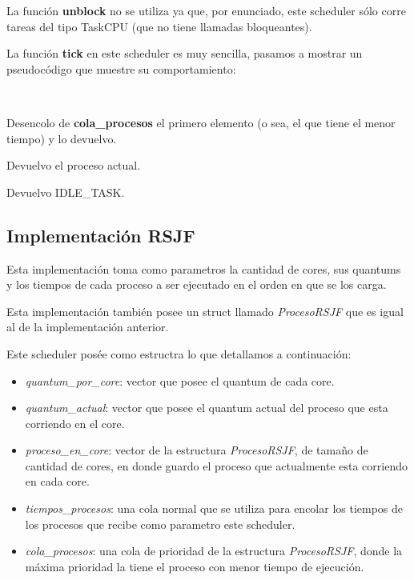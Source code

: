 La función \textbf{unblock} no se utiliza ya que, por enunciado, este scheduler sólo corre tareas del tipo TaskCPU (que no tiene llamadas bloqueantes).

La función \textbf{tick} en este scheduler es muy sencilla, pasamos a mostrar un pseudocódigo que muestre su comportamiento:

~

\begin{algorithmic}

		\State Desencolo de \textbf{cola\_procesos} el primero elemento (o sea, el que tiene el menor tiempo) y lo devuelvo.
	
		\State Devuelvo el proceso actual.

	\Else
		\State Devuelvo IDLE\_TASK.
	\EndIf
\EndFunction	
\end{algorithmic}


\subsection{Implementación \textbf{RSJF}}

Esta implementación toma como parametros la cantidad de cores, sus quantums y los tiempos de cada proceso a ser ejecutado en el orden en que se los carga.

Esta implementación también posee un struct llamado \emph{ProcesoRSJF} que es igual al de la implementación anterior.

Este scheduler posée como estructra lo que detallamos a continuación:

\begin{itemize}

\item \emph{quantum\_por\_core}: vector que posee el quantum de cada core.

\item \emph{quantum\_actual}: vector que posee el quantum actual del proceso que esta corriendo en el core.

\item \emph{proceso\_en\_core}: vector de la estructura \emph{ProcesoRSJF}, de tamaño de cantidad de cores, en donde guardo el proceso que actualmente esta corriendo en cada core.

\item \emph{tiempos\_procesos}: una cola normal que se utiliza para encolar los tiempos de los procesos que recibe como parametro este scheduler.

\item \emph{cola\_procesos}: una cola de prioridad de la estructura \emph{ProcesoRSJF}, donde la máxima prioridad la tiene el proceso con menor tiempo de ejecución.

\end{itemize}

